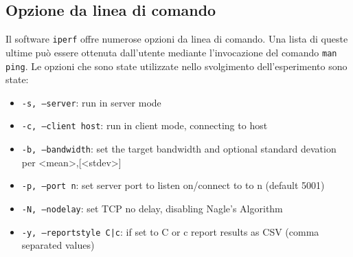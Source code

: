 \documentclass[a4paper,10pt]{article}
\begin{document}
\subsection{Opzione da linea di comando}
Il software \texttt{iperf} offre numerose opzioni da linea di comando. Una lista di queste ultime può essere ottenuta dall'utente mediante l'invocazione del comando \texttt{man ping}. Le opzioni che sono state utilizzate nello svolgimento dell'esperimento sono state:
\begin{itemize}
	\item \texttt{-s, --server}: run in server mode
	\item \texttt{-c, --client host}: run in client mode, connecting to host
	\item \texttt{-b, --bandwidth}: set the target bandwidth and optional standard devation per <mean>,[<stdev>]
	\item \texttt{-p, --port n}: set server port to listen on/connect to to n (default 5001)
	\item \texttt{-N, --nodelay}: set TCP no delay, disabling Nagle's Algorithm
	\item \texttt{-y, --reportstyle C|c}: if set to C or c report results as CSV (comma separated values)
\end{itemize}
\end{document}
